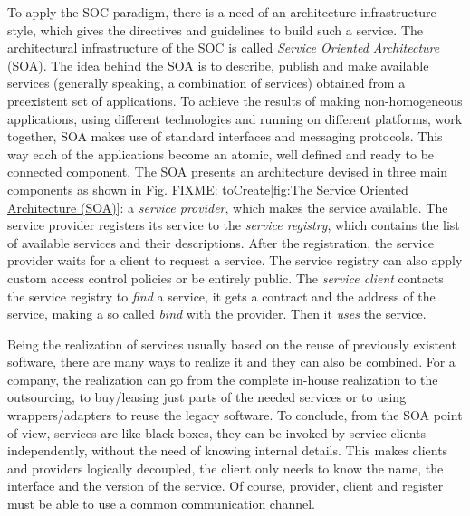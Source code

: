 To apply the SOC paradigm, there is a need of an architecture infrastructure style, which gives the directives and guidelines to build such a service.  
The architectural infrastructure of the SOC is called \textit{Service Oriented Architecture} (SOA). 
The idea behind the SOA is to describe, publish and make available services (generally speaking, a combination of services) obtained from a preexistent set of applications. 
To achieve the results of making non-homogeneous applications, using different technologies and running on different platforms, work together, SOA makes use of standard interfaces and messaging protocols. This way each of the applications become an atomic, well defined and ready to be connected component. 
The SOA presents an architecture devised in three main components \cite{Pernici04} as shown in Fig. FIXME: toCreate\ref{fig:The Service Oriented Architecture (SOA)}:
a \textit{service provider}, which makes the service available. The service provider registers its service to the \textit{service registry}, which contains the list of available services and their descriptions. After the registration, the service provider waits for a client to request a service. The service registry can also apply custom access control policies or be entirely public. 
The \textit{service client} contacts the service registry to \textit{find} a service, it gets a contract and the address of the service, making a so called \textit{bind} with the provider. Then it \textit{uses} the service.


Being the realization of services usually based on the reuse of previously existent software, there are many ways to realize it and they can also be combined. For a company, the realization can go from the complete in-house realization to the outsourcing, to buy/leasing just parts of the needed services or to using wrappers/adapters to reuse the legacy software.
To conclude, from the SOA point of view, services are like black boxes, they can be invoked by service clients independently, without the need of knowing internal details. This makes clients and providers logically decoupled, the client only needs to know the name, the interface and the version of the service. Of course, provider, client and register must be able to use a common communication channel. 

